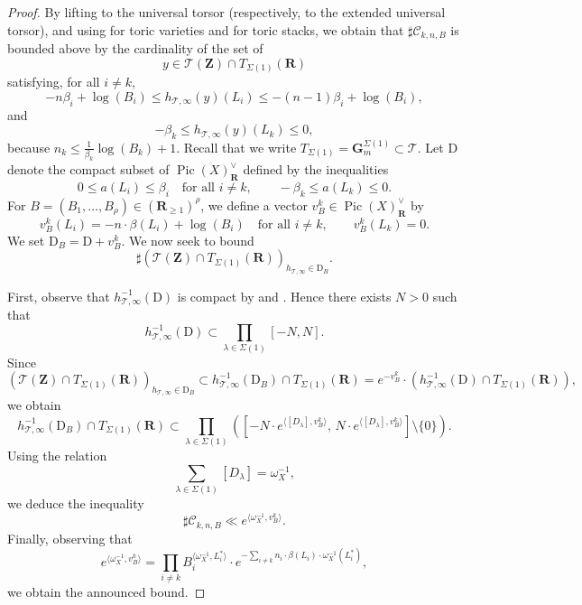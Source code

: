 \documentclass{proc-l}
\newcommand{\R}{\mathbf{R}}
\newcommand{\Z}{\mathbf{Z}}
\newcommand{\G}{\mathbf{G}}
\DeclareMathOperator{\Pic}{Pic}
\newcommand{\stackT}{\mathcal{T}}
\newcommand{\w}{\omega}
\theoremstyle{definition}
\theoremstyle{remark}
\numberwithin{equation}{section}
\begin{document}
\begin{proof}
By lifting to the universal torsor (respectively, to the extended universal torsor), and using \cite[Theorem 3.16]{bongiorno2024multiheightanalysisrationalpoints} for toric varieties and \cite[Theorem 6.23]{bongiorno_toric_stacks} for toric stacks, we obtain that \(\sharp \mathcal{C}_{k,n,B}\) is bounded above by the cardinality of the set of
\[
y \in \stackT(\Z) \cap T_{\Sigma(1)}(\R)
\]
satisfying, for all \(i \neq k\),
\[
- n \beta_i + \log(B_i)
\leqslant h_{\stackT,\infty}(y)(L_i)
\leqslant -(n-1) \beta_i + \log(B_i),
\]
and
\[
-\beta_k \leqslant h_{\stackT,\infty}(y)(L_k) \leqslant 0,
\]because $n_k \leqslant \frac{1}{\beta_k}\log(B_k)+1$. Recall that we write $T_{\Sigma(1)} = \G_m^{\Sigma(1)} \subset \stackT$. Let \(\mathrm{D}\) denote the compact subset of \(\Pic(X)^{\vee}_{\R}\) defined by the inequalities
\[
0 \leqslant a(L_i) \leqslant \beta_i \quad \text{for all } i \neq k,
\qquad
- \beta_k \leqslant a(L_k) \leqslant 0.
\]
For \(B = (B_1,\ldots,B_{\rho}) \in (\R_{\geqslant 1})^{\rho}\), we define a vector
\(v_B^k \in \Pic(X)^{\vee}_{\R}\) by
\[
v_B^k(L_i) = - n \cdot \beta(L_i) + \log(B_i)
\quad \text{for all } i \neq k,
\qquad
v_B^k(L_k) = 0 .
\]
We set \(\mathrm{D}_B = \mathrm{D} + v_B^k\).
We now seek to bound
\[
\sharp \left( \stackT(\Z) \cap T_{\Sigma(1)}(\R) \right)_{h_{\stackT,\infty} \in \mathrm{D}_B}.
\]

First, observe that \(h_{\stackT,\infty}^{-1}(\mathrm{D})\) is compact by
\cite[Lemma 4.3]{bongiorno2024multiheightanalysisrationalpoints} and
\cite[Theorem 6.29]{bongiorno_toric_stacks}. Hence there exists \(N > 0\) such that
\[
h_{\stackT,\infty}^{-1}(\mathrm{D})
\subset \prod_{\lambda \in \Sigma(1)} [-N,N].
\]
Since
\[
\left( \stackT(\Z) \cap T_{\Sigma(1)}(\R) \right)_{h_{\stackT,\infty} \in \mathrm{D}_B}
\subset
h_{\stackT,\infty}^{-1}(\mathrm{D}_B) \cap T_{\Sigma(1)}(\R)
=
e^{-v_B^k} \cdot \left( h_{\stackT,\infty}^{-1}(\mathrm{D}) \cap T_{\Sigma(1)}(\R) \right),
\]
we obtain
\[
h_{\stackT,\infty}^{-1}(\mathrm{D}_B) \cap T_{\Sigma(1)}(\R)
\subset
\prod_{\lambda \in \Sigma(1)}
\left(
\left[
- N \cdot e^{\langle [D_{\lambda}], v_B^k \rangle},
\,
N \cdot e^{\langle [D_{\lambda}], v_B^k \rangle}
\right]
\setminus \{0\}
\right).
\]
Using the relation
\[
\sum_{\lambda \in \Sigma(1)} [D_{\lambda}] = \w_{X}^{-1},
\]
we deduce the inequality
\[
\sharp \mathcal{C}_{k,n,B} \ll e^{\langle \w_{X}^{-1}, v_B^k \rangle}.
\]
Finally, observing that
\[
e^{\langle \w_{X}^{-1}, v_B^k \rangle}
=
\prod_{i \neq k } B_i^{\langle \w_{X}^{-1}, L_i^* \rangle}
\cdot
e^{- \sum\limits_{i \neq k} n_i \cdot \beta(L_i) \cdot \w_{X}^{-1}( L_i^*) },
\]
we obtain the announced bound.
\end{proof}
\end{document}

